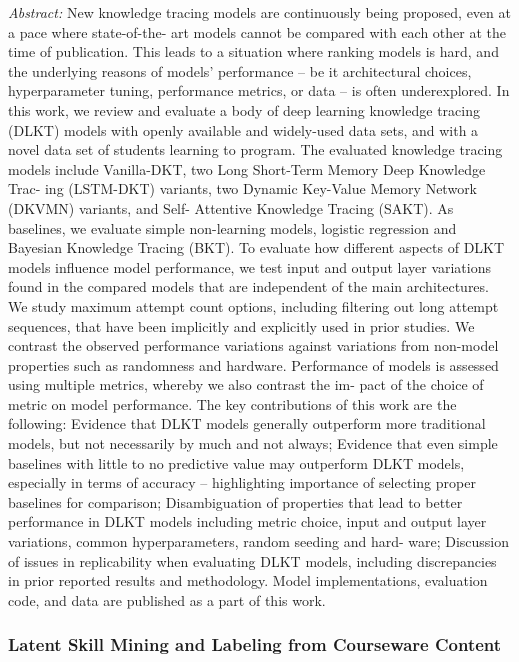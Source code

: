 \documentclass[letterpaper,11pt,oneside]{book} %
\begin{document}
\emph{Abstract:} New knowledge tracing models are continuously being
proposed, even at a pace where state-of-the- art models cannot be
compared with each other at the time of publication. This leads to a
situation where ranking models is hard, and the underlying reasons of
models' performance -- be it architectural choices, hyperparameter
tuning, performance metrics, or data -- is often underexplored. In this
work, we review and evaluate a body of deep learning knowledge tracing
(DLKT) models with openly available and widely-used data sets, and with
a novel data set of students learning to program. The evaluated
knowledge tracing models include Vanilla-DKT, two Long Short-Term Memory
Deep Knowledge Trac- ing (LSTM-DKT) variants, two Dynamic Key-Value
Memory Network (DKVMN) variants, and Self- Attentive Knowledge Tracing
(SAKT). As baselines, we evaluate simple non-learning models, logistic
regression and Bayesian Knowledge Tracing (BKT). To evaluate how
different aspects of DLKT models influence model performance, we test
input and output layer variations found in the compared models that are
independent of the main architectures. We study maximum attempt count
options, including filtering out long attempt sequences, that have been
implicitly and explicitly used in prior studies. We contrast the
observed performance variations against variations from non-model
properties such as randomness and hardware. Performance of models is
assessed using multiple metrics, whereby we also contrast the im- pact
of the choice of metric on model performance. The key contributions of
this work are the following: Evidence that DLKT models generally
outperform more traditional models, but not necessarily by much and not
always; Evidence that even simple baselines with little to no predictive
value may outperform DLKT models, especially in terms of accuracy --
highlighting importance of selecting proper baselines for comparison;
Disambiguation of properties that lead to better performance in DLKT
models including metric choice, input and output layer variations,
common hyperparameters, random seeding and hard- ware; Discussion of
issues in replicability when evaluating DLKT models, including
discrepancies in prior reported results and methodology. Model
implementations, evaluation code, and data are published as a part of
this work.

\hypertarget{latent-skill-mining-and-labeling-from-courseware-content}{%
\subsubsection{Latent Skill Mining and Labeling from Courseware
Content}\label{latent-skill-mining-and-labeling-from-courseware-content}}
\end{document}
